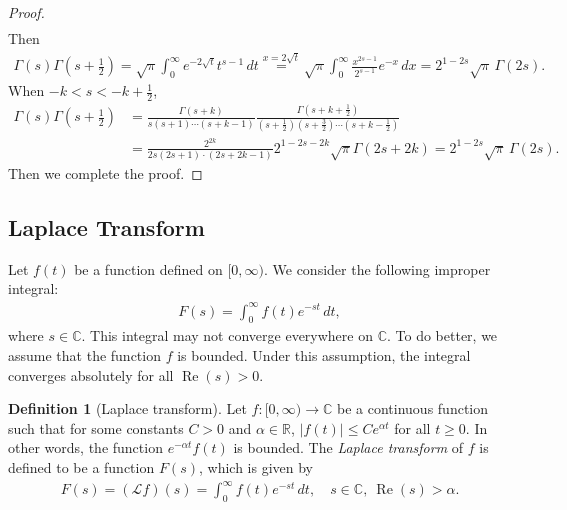 \documentclass{article}
\numberwithin{equation}{section}
\newcommand{\bbC}{\mathbb{C}}
\newcommand{\bbR}{\mathbb{R}}
\renewcommand{\cal}{\mathcal}
\DeclareMathOperator{\re}{Re}
\theoremstyle{plain}
\theoremstyle{definition}
\newtheorem{definition}[theorem]{Definition}
\begin{document}
\begin{proof}
\begin{align*}
\end{align*}
Then
\begin{align*}
\Gamma(s)\Gamma\left(s+\frac{1}{2}\right)=\sqrt{\pi}\int_0^\infty 	e^{-2\sqrt{t}} t^{s-1}\,dt\overset{x=2\sqrt{t}}{=}\sqrt{\pi}\int_0^\infty 	\frac{x^{2s-1}}{2^{s-1}}e^{-x}\,dx=2^{1-2s}\sqrt{\pi}\,\Gamma(2s).
\end{align*}
When $-k<s<-k+\frac{1}{2}$,
\begin{align*}
\Gamma(s)\Gamma\left(s+\frac{1}{2}\right)&=\frac{\Gamma(s+k)}{s(s+1)\cdots(s+k-1)}\frac{\Gamma\left(s+k+\frac{1}{2}\right)}{\left(s+\frac{1}{2}\right)\left(s+\frac{3}{2}\right)\cdots\left(s+k-\frac{1}{2}\right)}\\
&=\frac{2^{2k}}{2s(2s+1)\cdot(2s+2k-1)}2^{1-2s-2k}\sqrt{\pi}\Gamma(2s+2k)=2^{1-2s}\sqrt{\pi}\,\Gamma(2s).
\end{align*}
Then we complete the proof.
\end{proof}
\subsection{Laplace Transform}
Let $f(t)$ be a function defined on $[0,\infty)$. We consider the following improper integral:
\begin{align*}
	F(s)=\int_0^\infty f(t)e^{-st}\,dt,
\end{align*}
where $s\in\bbC$. This integral may not converge everywhere on $\bbC$. To do better, we assume that the function $f$ is bounded. Under this assumption, the integral converges absolutely for all $\re(s)>0$. 

\begin{definition}[Laplace transform]
Let $f:[0,\infty)\to\bbC$ be a continuous function such that for some constants $C>0$ and $\alpha\in\bbR$, $\vert f(t)\vert\leq Ce^{\alpha t}$ for all $t\geq 0$. In other words, the function $e^{-\alpha t}f(t)$ is bounded. The \textit{Laplace transform} of $f$ is defined to be a function $F(s)$, which is given by
\begin{align*}
	F(s)=(\cal{L}f)(s)=\int_0^\infty f(t)e^{-st}\,dt,\quad s\in\bbC,\ \re(s)>\alpha.
\end{align*}
\end{definition} 
\end{document}
